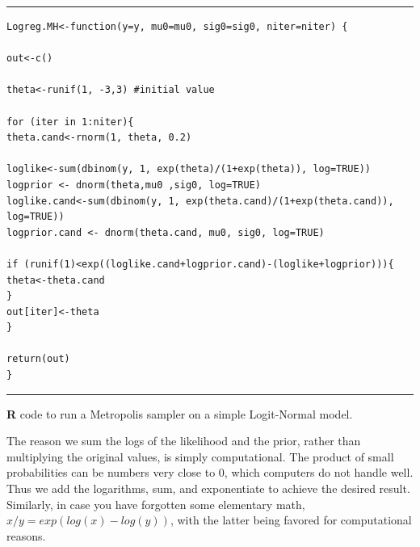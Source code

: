 \begin{panel}[htp]
\centering
\rule[0.15in]{\textwidth}{.03in}
{\small
\begin{verbatim}
Logreg.MH<-function(y=y, mu0=mu0, sig0=sig0, niter=niter) {

out<-c()

theta<-runif(1, -3,3) #initial value

for (iter in 1:niter){
theta.cand<-rnorm(1, theta, 0.2)

loglike<-sum(dbinom(y, 1, exp(theta)/(1+exp(theta)), log=TRUE))
logprior <- dnorm(theta,mu0 ,sig0, log=TRUE)
loglike.cand<-sum(dbinom(y, 1, exp(theta.cand)/(1+exp(theta.cand)), log=TRUE))
logprior.cand <- dnorm(theta.cand, mu0, sig0, log=TRUE)

if (runif(1)<exp((loglike.cand+logprior.cand)-(loglike+logprior))){
theta<-theta.cand
}
out[iter]<-theta
}

return(out)
}
\end{verbatim}
}
\rule[-0.15in]{\textwidth}{.03in}
\caption{
{\bf R} code to run a Metropolis sampler on a simple Logit-Normal model.
}
\label{mcmc.panel.logitnormal}
\end{panel}



The reason we sum the logs of the likelihood and the prior, rather than multiplying the original values, is simply computational. The product of small probabilities can be numbers very close to 0, which computers do not handle well. Thus we add the logarithms, sum, and exponentiate to achieve the desired result. Similarly, in case you have forgotten some elementary math, $x/y = exp(log(x)-log(y))$, with the latter being favored for computational reasons.


